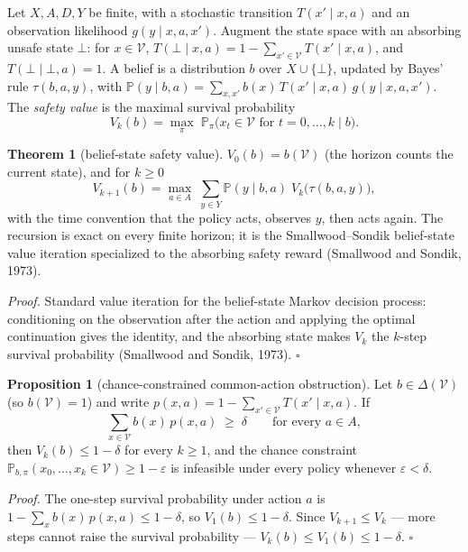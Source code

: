 \documentclass[10pt,twocolumn]{article}
\theoremstyle{definition}
\newtheorem{theorem}{Theorem}
\newtheorem{proposition}{Proposition}
\begin{document}
Let \(X, A, D, Y\) be finite, with a stochastic transition \(T(x' \mid x, a)\) and an observation likelihood \(g(y \mid x, a, x')\). Augment the state space with an absorbing unsafe state \(\bot\): for \(x \in \mathcal{V}\), \(T(\bot \mid x, a) = 1 - \sum_{x' \in \mathcal{V}} T(x' \mid x, a)\), and \(T(\bot \mid \bot, a) = 1\). A belief is a distribution \(b\) over \(X \cup \{\bot\}\), updated by Bayes' rule \(\tau(b, a, y)\), with \(\mathbb{P}(y \mid b, a) = \sum_{x, x'} b(x)\, T(x' \mid x, a)\, g(y \mid x, a, x')\). The \emph{safety value} is the maximal survival probability
\[
V_{k}(b) = \max_{\pi}\; \mathbb{P}_{\pi}\bigl( x_{t} \in \mathcal{V} \text{ for } t = 0, \dots, k \;\big|\; b \bigr).
\]

\begin{theorem}[belief-state safety value]\label{thm:pomdp}
\(V_{0}(b) = b(\mathcal{V})\) (the horizon counts the current state), and for \(k \ge 0\)
\[
V_{k+1}(b) = \max_{a \in A}\; \sum_{y \in Y} \mathbb{P}(y \mid b, a)\; V_{k}\bigl(\tau(b, a, y)\bigr),
\]
with the time convention that the policy acts, observes \(y\), then acts again. The recursion is exact on every finite horizon; it is the Smallwood--Sondik belief-state value iteration specialized to the absorbing safety reward (Smallwood and Sondik, 1973).
\end{theorem}

\emph{Proof.} Standard value iteration for the belief-state Markov decision process: conditioning on the observation after the action and applying the optimal continuation gives the identity, and the absorbing state makes \(V_{k}\) the \(k\)-step survival probability (Smallwood and Sondik, 1973). \hfill\(\square\)

\begin{proposition}[chance-constrained common-action obstruction]\label{prop:chance}
Let \(b \in \Delta(\mathcal{V})\) (so \(b(\mathcal{V}) = 1\)) and write \(p(x,a) = 1 - \sum_{x' \in \mathcal{V}} T(x' \mid x, a)\). If
\[
\sum_{x \in \mathcal{V}} b(x)\, p(x,a) \;\ge\; \delta \qquad \text{for every } a \in A,
\]
then \(V_{k}(b) \le 1 - \delta\) for every \(k \ge 1\), and the chance constraint \(\mathbb{P}_{b,\pi}(x_{0}, \dots, x_{k} \in \mathcal{V}) \ge 1 - \varepsilon\) is infeasible under every policy whenever \(\varepsilon < \delta\).
\end{proposition}

\emph{Proof.} The one-step survival probability under action \(a\) is \(1 - \sum_{x} b(x)\, p(x,a) \le 1 - \delta\), so \(V_{1}(b) \le 1 - \delta\). Since \(V_{k+1} \le V_{k}\) --- more steps cannot raise the survival probability --- \(V_{k}(b) \le V_{1}(b) \le 1 - \delta\). \hfill\(\square\)
\end{document}
